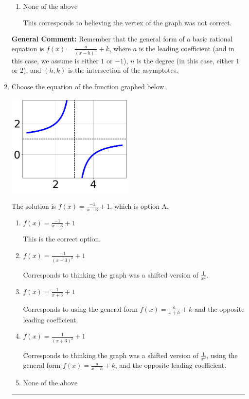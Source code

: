 \documentclass{extbook}[14pt]
\newcommand{\litem}[1]{\item #1

\rule{\textwidth}{0.4pt}}
\begin{document}
\begin{enumerate}
{\begin{enumerate}[label=\Alph*.]
Corresponds to using the general form $f(x) = \frac{a}{(x+h)^2}+k$ and the opposite leading coefficient.
\item \( \text{None of the above} \)

This corresponds to believing the vertex of the graph was not correct.
\end{enumerate}

\textbf{General Comment:} Remember that the general form of a basic rational equation is $ f(x) = \frac{a}{(x-h)^n} + k$, where $a$ is the leading coefficient (and in this case, we assume is either $1$ or $-1$), $n$ is the degree (in this case, either $1$ or $2$), and $(h, k)$ is the intersection of the asymptotes.
}
\litem{
Choose the equation of the function graphed below.

\begin{center}
    \includegraphics[width=0.5\textwidth]{../Figures/rationalGraphToEquationB.png}
\end{center}


The solution is \( f(x) = \frac{-1}{x - 3} + 1 \), which is option A.\begin{enumerate}[label=\Alph*.]
\item \( f(x) = \frac{-1}{x - 3} + 1 \)

This is the correct option.
\item \( f(x) = \frac{-1}{(x - 3)^2} + 1 \)

Corresponds to thinking the graph was a shifted version of $\frac{1}{x^2}$.
\item \( f(x) = \frac{1}{x + 3} + 1 \)

Corresponds to using the general form $f(x) = \frac{a}{x+h}+k$ and the opposite leading coefficient.
\item \( f(x) = \frac{1}{(x + 3)^2} + 1 \)

Corresponds to thinking the graph was a shifted version of $\frac{1}{x^2}$, using the general form $f(x) = \frac{a}{x+h}+k$, and the opposite leading coefficient.
\item \( \text{None of the above} \)


\end{enumerate}}
\end{enumerate}
\end{document}
